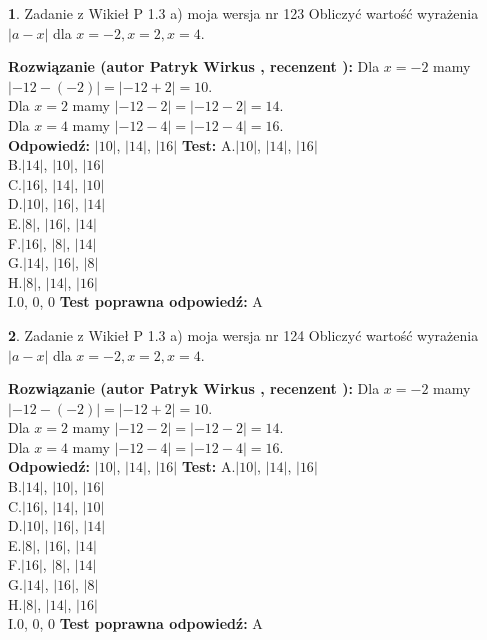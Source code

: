 \documentclass[12pt, a4paper]{article}
\theoremstyle{definition} %
\newtheorem{zad}{}
\newcommand{\zadStart}[1]{\begin{zad}#1\newline}
\newcommand{\zadStop}{\end{zad}}
\newcommand{\rozwStart}[2]{\noindent \textbf{Rozwiązanie (autor #1 , recenzent #2): }\newline}
\newcommand{\rozwStop}{\newline}
\newcommand{\odpStart}{\noindent \textbf{Odpowiedź:}\newline}
\newcommand{\odpStop}{\newline}
\newcommand{\testStart}{\noindent \textbf{Test:}\newline}
\newcommand{\testStop}{\newline}
\newcommand{\kluczStart}{\noindent \textbf{Test poprawna odpowiedź:}\newline}
\newcommand{\kluczStop}{\newline}
\begin{document}
\zadStart{Zadanie z Wikieł P 1.3 a) moja wersja nr 123}
Obliczyć wartość wyrażenia $|a - x|$ dla $x=-2,x=2,x=4$.
\zadStop
\rozwStart{Patryk Wirkus}{}
Dla $x = -2$ mamy $|-12 - (-2)| = |-12 + 2| = 10$.\\
Dla $x = 2$ mamy $|-12 - 2| = |-12 - 2| = 14$.\\
Dla $x = 4$ mamy $|-12 - 4| = |-12 - 4| = 16$.\\
\rozwStop
\odpStart
$|10|$, $|14|$, $|16|$
\odpStop
\testStart
A.$|10|$, $|14|$, $|16|$\\
B.$|14|$, $|10|$, $|16|$\\
C.$|16|$, $|14|$, $|10|$\\
D.$|10|$, $|16|$, $|14|$\\
E.$|8|$, $|16|$, $|14|$\\
F.$|16|$, $|8|$, $|14|$\\
G.$|14|$, $|16|$, $|8|$\\
H.$|8|$, $|14|$, $|16|$\\
I.$0$, $0$, $0$
\testStop
\kluczStart
A
\kluczStop



\zadStart{Zadanie z Wikieł P 1.3 a) moja wersja nr 124}
Obliczyć wartość wyrażenia $|a - x|$ dla $x=-2,x=2,x=4$.
\zadStop
\rozwStart{Patryk Wirkus}{}
Dla $x = -2$ mamy $|-12 - (-2)| = |-12 + 2| = 10$.\\
Dla $x = 2$ mamy $|-12 - 2| = |-12 - 2| = 14$.\\
Dla $x = 4$ mamy $|-12 - 4| = |-12 - 4| = 16$.\\
\rozwStop
\odpStart
$|10|$, $|14|$, $|16|$
\odpStop
\testStart
A.$|10|$, $|14|$, $|16|$\\
B.$|14|$, $|10|$, $|16|$\\
C.$|16|$, $|14|$, $|10|$\\
D.$|10|$, $|16|$, $|14|$\\
E.$|8|$, $|16|$, $|14|$\\
F.$|16|$, $|8|$, $|14|$\\
G.$|14|$, $|16|$, $|8|$\\
H.$|8|$, $|14|$, $|16|$\\
I.$0$, $0$, $0$
\testStop
\kluczStart
A
\kluczStop
\end{document}
